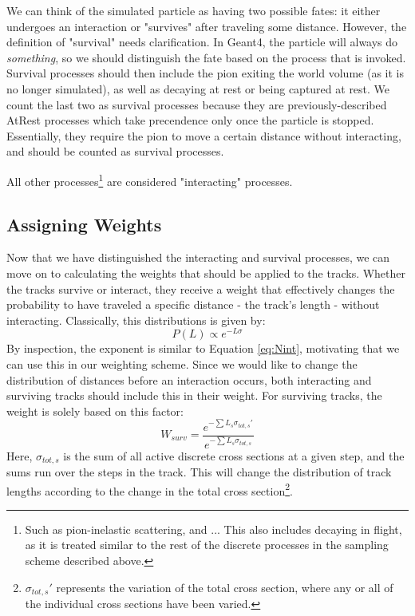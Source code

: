\documentclass[12pt]{article}
\begin{document}
We can think of the simulated particle as having two possible fates: it either undergoes an interaction or "survives" after traveling some distance. However, the definition of "survival" needs clarification. In Geant4, the particle will always do \textit{something}, so we should distinguish the fate based on the process that is invoked. Survival processes should then include the pion exiting the world volume (as it is no longer simulated), as well as decaying at rest or being captured at rest. We count the last two as survival processes because they are previously-described AtRest processes which take precendence only once the particle is stopped. Essentially, they require the pion to move a certain distance without interacting, and should be counted as survival processes. 

All other processes\footnote{Such as pion-inelastic scattering, and ... This also includes decaying in flight, as it is treated similar to the rest of the discrete processes in the sampling scheme described above. } 
are considered "interacting" processes. 

\subsection{Assigning Weights}

Now that we have distinguished the interacting and survival processes, we can move on to calculating the weights that should be applied to the tracks. Whether the tracks survive or interact, they receive a weight that effectively changes the probability to have traveled a specific distance - the track's length - without interacting. Classically, this distributions is given by:
\begin{equation}\label{eq:dist_prob}
P(L) \propto e^{-L \sigma}
\end{equation}
By inspection, the exponent is similar to Equation \ref{eq:Nint}, motivating that we can use this in our weighting scheme. Since we would like to change the distribution of distances before an interaction occurs, both interacting and surviving tracks should include this in their weight. For surviving tracks, the weight is solely based on this factor:
\begin{equation}\label{eq:surv_weight}
  W_{surv} = \frac{e^{-\sum L_s  \sigma_{tot,s}'}}{e^{-\sum L_s  \sigma_{tot,s}}}
\end{equation}
Here, $\sigma_{tot,s}$ is the sum of all active discrete cross sections at a given step, and the sums run over the steps in the track. This will change the distribution of track lengths according to the change in the total cross section\footnote{$\sigma_{tot,s}'$ represents the variation of the total cross section, where any or all of the individual cross sections have been varied.}.
\end{document}
